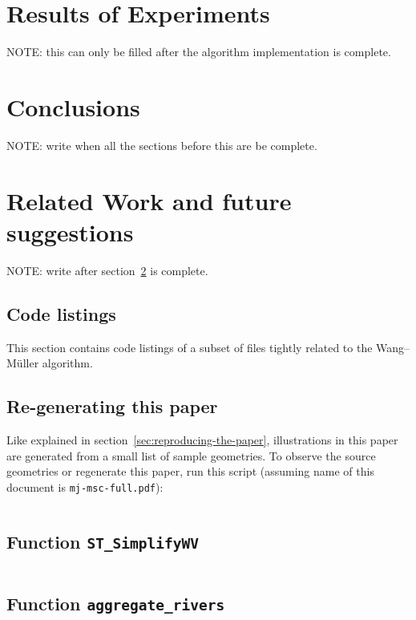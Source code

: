 \documentclass[a4paper]{article}
\newcommand{\inputcode}[2]{\inputminted[fontsize=\small]{#1}{#2}}
\newcommand{\inputcode}[2]{}
\newcommand{\WM}{Wang--M{\"u}ller}
\begin{document}
\section{Results of Experiments}

NOTE: this can only be filled after the algorithm implementation is complete.

\section{Conclusions}
\label{sec:conclusions}

NOTE: write when all the sections before this are be complete.

\section{Related Work and future suggestions}
\label{sec:related_work}

NOTE: write after section~\ref{sec:conclusions} is complete.

\printbibliography

\begin{appendices}

\section{Code listings}

This section contains code listings of a subset of files tightly related to the
    {\WM} algorithm.

\subsection{Re-generating this paper}
\label{sec:code-regenerate}

Like explained in section~\ref{sec:reproducing-the-paper}, illustrations in
    this paper are generated from a small list of sample geometries. To observe
    the source geometries or regenerate this paper, run this script (assuming
    name of this document is {\tt mj-msc-full.pdf}):

\inputcode{bash}{extract-and-generate}

\subsection{Function \texttt{ST\_SimplifyWV}}
\inputcode{postgresql}{wm.sql}

\subsection{Function \texttt{aggregate\_rivers}}
\inputcode{postgresql}{aggregate-rivers.sql}

\end{appendices}
\end{document}
